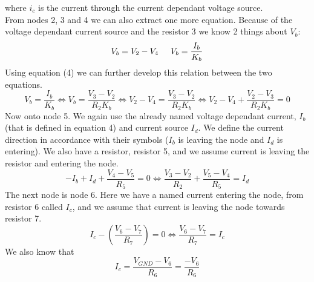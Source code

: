 where $i_c$ is the current through the current dependant voltage source.\\
From nodes 2, 3 and 4 we can also extract one more equation. Because of the voltage dependant current source and the resistor 3 we know 2 things about $V_{b}$:
\[V_{b}=V_{2}-V_{4} \hspace{5mm} V_{b}=\frac{I_{b}}{K_{b}} \]
Using equation (4) we can further develop this relation between the two equations.
\begin{equation}
    V_{b}=\frac{I_{b}}{K_{b}} \Leftrightarrow V_{b}=\frac{V_{3}-V_{2}}{R_{2} K_{b}} \Leftrightarrow V_{2}-V_{4}=\frac{V_{3}-V_{2}}{R_{2} K_{b}} \Leftrightarrow V_{2}-V_{4}+\frac{V_{2}-V_{3}}{R_{2} K_{b}}=0
\end{equation}
Now onto node 5. We again use the already named voltage dependant current, $I_{b}$ (that is defined in equation 4) and current source $I_{d}$. We define the current direction in accordance with their symbols ($I_{b}$ is leaving the node and $I_{d}$ is entering). We also have a resistor, resistor 5, and we assume current is leaving the resistor and entering the node. 
\begin{equation}
    -I_{b}+I_{d}+\frac{V_{4}-V_{5}}{R_{5}}=0 \Leftrightarrow 
    \frac{V_{3}-V_{2}}{R_{2}}+\frac{V_{5}-V_{4}}{R_{5}}=I_{d}
\end{equation}
The next node is node 6. Here we have a named current entering the node, from resistor 6 called $I_{c}$, and we assume that current is leaving the node towards resistor 7. 
\begin{equation}
    I_{c}-\left(\frac{V_{6}-V_{7}}{R_{7}}\right)=0 \Leftrightarrow 
    \frac{V_{6}-V_{7}}{R_{7}}=I_{c} 
\end{equation}
We also know that
\begin{equation}
   I_{c}=\frac{V_{GND}-V_{6}}{R_{6}}=\frac{-V_{6}}{R_{6}}  
\end{equation}

